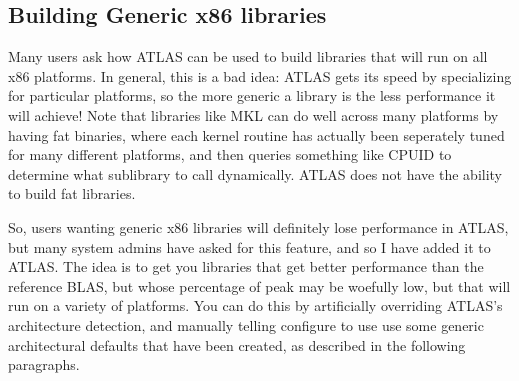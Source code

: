 \documentclass[11pt]{article}
\newcommand{\Wskip}[1]{ }
\begin{document}
\Wskip{
\subsection{Manually setting OS, architecture, assembly dialect}
\label{sec-OS-override}

Configure's selection of operating system, architecture, assembly dialect
and SIMD vectorization type are all controlled by enumerated types.
Occasionally, configure will misdetect one of these values and so
configure provides
flags for overriding configures detecting of these features.

\subsubsection{Manually overriding the assembly dialect}
\subsubsection{Manually overriding SIMD vectorization type}
\label{sec-SIMD-override}
Also, the installer
may occasionally want to refrain from using a feature that this machine
possesses, but other machines that plan to use the same library don't.
For instance, the installation machine might have SSE3, but the installer
wants to use the same library on machines that possess only SSE2, and so
the installer wants to use only SSE2, even though this will make the library
sub-optimal on the machine possessing SSE3.  
}

\subsection{Building Generic x86 libraries}
Many users ask how ATLAS can be used to build libraries that will run on
all x86 platforms.  In general, this is a bad idea: ATLAS gets its speed by
specializing for particular platforms, so the more generic a library is the
less performance it will achieve!  Note that libraries like MKL can do well
across many platforms by having fat binaries, where each kernel routine has
actually
been seperately tuned for many different platforms, and then queries something
like CPUID
to determine what sublibrary to call dynamically.  ATLAS does not have the
ability to build fat libraries.

So, users wanting generic x86 libraries will definitely lose performance in
ATLAS, but many system admins have asked for this feature, and so I have
added it to ATLAS.  The idea is to get you libraries that get better 
performance than the reference BLAS, but whose percentage of peak may be
woefully low, but that will run on a variety of platforms.  You can do this
by artificially overriding ATLAS's architecture detection, and manually
telling configure to use use some generic architectural defaults that have
been created, as described in the following paragraphs.
\end{document}
